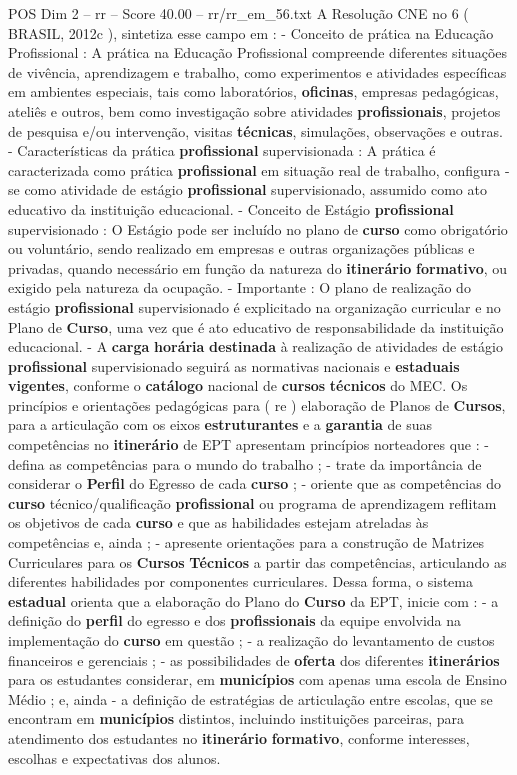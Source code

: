 \begin{textsample}{POS Dim 2 – rr – Score 40.00 – rr/rr\_em\_56.txt}
A Resolução CNE no 6 ( BRASIL, 2012c ), sintetiza esse campo em : - Conceito de prática na Educação Profissional : A prática na Educação Profissional compreende diferentes situações de vivência, aprendizagem e trabalho, como experimentos e atividades específicas em ambientes especiais, tais como laboratórios, \textbf{oficinas}, empresas pedagógicas, ateliês e outros, bem como investigação sobre atividades \textbf{profissionais}, projetos de pesquisa e/ou intervenção, visitas \textbf{técnicas}, simulações, observações e outras. - Características da prática \textbf{profissional} supervisionada : A prática é caracterizada como prática \textbf{profissional} em situação real de trabalho, configura -se como atividade de estágio \textbf{profissional} supervisionado, assumido como ato educativo da instituição educacional. - Conceito de Estágio \textbf{profissional} supervisionado : O Estágio pode ser incluído no plano de \textbf{curso} como obrigatório ou voluntário, sendo realizado em empresas e outras organizações públicas e privadas, quando necessário em função da natureza do \textbf{itinerário} \textbf{formativo}, ou exigido pela natureza da ocupação. - Importante : O plano de realização do estágio \textbf{profissional} supervisionado é explicitado na organização curricular e no Plano de \textbf{Curso}, uma vez que é ato educativo de responsabilidade da instituição educacional. - A \textbf{carga} \textbf{horária} \textbf{destinada} à realização de atividades de estágio \textbf{profissional} supervisionado seguirá as normativas nacionais e \textbf{estaduais} \textbf{vigentes}, conforme o \textbf{catálogo} nacional de \textbf{cursos} \textbf{técnicos} do MEC.
Os princípios e orientações pedagógicas para ( re ) elaboração de Planos de \textbf{Cursos}, para a articulação com os eixos \textbf{estruturantes} e a \textbf{garantia} de suas competências no \textbf{itinerário} de EPT apresentam princípios norteadores que : - defina as competências para o mundo do trabalho ; - trate da importância de considerar o \textbf{Perfil} do Egresso de cada \textbf{curso} ; - oriente que as competências do \textbf{curso} técnico/qualificação \textbf{profissional} ou programa de aprendizagem reflitam os objetivos de cada \textbf{curso} e que as habilidades estejam atreladas às competências e, ainda ; - apresente orientações para a construção de Matrizes Curriculares para os \textbf{Cursos} \textbf{Técnicos} a partir das competências, articulando as diferentes habilidades por componentes curriculares.
Dessa forma, o sistema \textbf{estadual} orienta que a elaboração do Plano do \textbf{Curso} da EPT, inicie com : - a definição do \textbf{perfil} do egresso e dos \textbf{profissionais} da equipe envolvida na implementação do \textbf{curso} em questão ; - a realização do levantamento de custos financeiros e gerenciais ; - as possibilidades de \textbf{oferta} dos diferentes \textbf{itinerários} para os estudantes considerar, em \textbf{municípios} com apenas uma escola de Ensino Médio ; e, ainda - a definição de estratégias de articulação entre escolas, que se encontram em \textbf{municípios} distintos, incluindo instituições parceiras, para atendimento dos estudantes no \textbf{itinerário} \textbf{formativo}, conforme interesses, escolhas e expectativas dos alunos.

\end{textsample}
